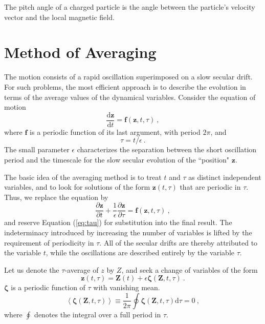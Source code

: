 \documentclass[12pt,a4paper]{article}
\renewcommand{\vec}[1]{\boldsymbol{#1}}
\newcommand{\dif}{\mathrm{d}}
\begin{document}
The pitch angle of a charged particle is the angle between the particle's velocity vector and the local magnetic field.

\section{Method of Averaging}
\cite{Plasma2014} The motion consists of a rapid oscillation superimposed on a slow secular drift. For such problems, the most efficient approach is to describe the evolution in terms of the average values of the dynamical variables. Consider the equation of motion
\begin{equation}
\dfrac{\dif \vec{z}}{\dif t} = \vec{f}(\vec{z}, t, \tau) ~,
\end{equation}
where $\vec{f}$ is a periodic function of its last argument, with period $2\pi$, and 
\begin{equation}
\tau = t /\epsilon ~.
\label{eq:tau}
\end{equation}
The small parameter $\epsilon$ characterizes the separation between the short oscillation period and the timescale for the slow secular evolution of the ``position" $\vec{z}$.

The basic idea of the averaging method is to treat $t$ and $\tau$ as distinct independent variables, and to look for solutions of the form $\vec{z}(t, \tau)$ that are periodic in $\tau$. Thus, we replace the equation by
\begin{equation}
\dfrac{\partial \vec{z}}{\partial t} +\dfrac{1}{\epsilon} \dfrac{\partial \vec{z}}{\partial \tau}   = \vec{f}(\vec{z}, t, \tau) ~,
\label{eq:z2}
\end{equation}
and reserve Equation (\ref{eq:tau}) for substitution into the final result. The indeterminacy introduced by increasing the number of variables is lifted by the requirement of periodicity in $\tau$. All of the secular drifts are thereby attributed to the variable $t$, while
the oscillations are described entirely by the variable $\tau$.

Let us denote the $\tau$-average of $z$ by $Z$, and seek a change of variables of the form
\begin{equation}
\vec{z}(t, \tau) = \vec{Z}(t) +\epsilon \vec{\zeta}(\vec{Z}, t, \tau) ~.
\end{equation}
$\vec{\zeta}$ is a periodic function of $\tau$ with vanishing mean.
\begin{equation}
\left\langle \vec{\zeta}(\vec{Z}, t, \tau) \right\rangle \equiv \dfrac{1}{2\pi} \oint \vec{\zeta}(\vec{Z}, t, \tau) \dif \tau = 0 ~,
\end{equation}
where $\oint$ denotes the integral over a full period in $\tau$.
\end{document}
